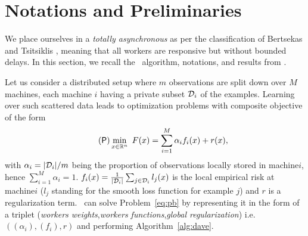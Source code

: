 \section{Notations and Preliminaries}\label{sec:distributed-prelim}

We place ourselves in a \emph{totally asynchronous} as per the classification of Bertsekas and Tsitsiklis \cite[Chap.]{bertsekas1989parallel}, meaning that all workers are responsive but without bounded delays. In this section, we recall the \dave~algorithm, notations, and results from \cite{mishchenko2019distributed}. 

Let us consider a distributed setup where $m$ observations are split down over $M$ machines, each machine $i$ having a private subset $\mathcal{D}_i$ of the examples.
Learning over such scattered data leads to optimization problems with composite objective of the form
\begin{align}\label{eq:pb}
\tag{$\mathsf{P}$}
\min_{x\in\mathbb{R}^n}  ~ F(x) =  \sum_{i=1}^M  \alpha_i  f_i(x)  +  r(x),
\end{align}
with $\alpha_i= |\mathcal{D}_i|/m$ being the proportion of observations locally stored in machine\;$i$, hence $\sum_{i=1}^M\alpha_i = 1$. $f_i(x) = \frac{1}{|\mathcal{D}_i|}  \sum_{j\in\mathcal{D}_i}l_j(x) $ is the local empirical risk at machine\;$i$ ($l_j$ standing for the smooth loss function for example $j$) and $r$ is a regularization term. \dave~can solve Problem~\eqref{eq:pb} by representing it in the form of a triplet (\emph{workers weights},\emph{workers functions},\emph{global regularization}) i.e. $((\alpha_i),(f_i),r)$ and performing Algorithm~\ref{alg:dave}.



